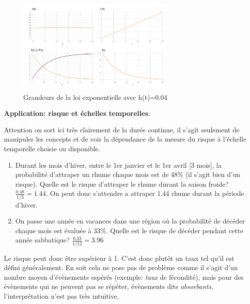 \documentclass[
  12pt,
  letterpaper,
  DIV=11,
  numbers=noendperiod,
  onepage,
  openany]{scrreprt}
\begin{document}
\begin{figure}

\caption{Grandeurs de la loi exponentielle avec h(t)=0.04}

{\centering \includegraphics[width=0.7\textwidth,height=\textheight]{images/Image5.png}

}

\end{figure}

\textbf{Application: risque et échelles temporelles}:

Attention on sort ici très clairement de la durée continue, il s'agit
seulement de manipuler les concepts et de voir la dépendance de la
mesure du risque à l'échelle temporelle choisie ou disponible.

\begin{enumerate}
\def\labelenumi{\arabic{enumi}.}
\item
  Durant les mois d'hiver, entre le 1er janvier et le 1er avril {[}3
  mois{]}, la probabilité d'attraper un rhume chaque mois est de 48\%
  (il s'agit bien d'un risque). Quelle est le risque d'attraper le rhume
  durant la saison froide?\\
  \(\frac{0.48}{1/3}=1.44\). On peut donc s'attendre a attraper 1.44
  rhume durant la période d'hiver.
\item
  On passe une année en vacances dans une région où la probabilité de
  décéder chaque mois est évaluée à 33\%. Quelle est le risque de
  décéder pendant cette année sabbatique? \(\frac{0.33}{1/12}=3.96\)
\end{enumerate}

Le risque peut donc être supérieur à 1. C'est donc plutôt un taux tel
qu'il est défini généralement. En soit cela ne pose pas de problème
comme il s'agit d'un nombre moyen d'évènements espérés (exemple:
\emph{taux} de fécondité), mais pour des évènements qui ne peuvent pas
se répéter, évènements dits \emph{absorbants}, l'interprétation n'est
pas très intuitive.
\end{document}
